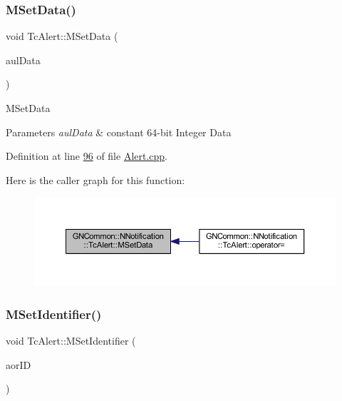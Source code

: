 \subsubsection{\texorpdfstring{M\+Set\+Data()}{MSetData()}}
{\footnotesize\ttfamily void Tc\+Alert\+::\+M\+Set\+Data (\begin{DoxyParamCaption}\item[{const \mbox{\hyperlink{namespace_g_n_common_a9404ee6090c788ae70aebd1436ceb97d}{Tu64}}}]{aul\+Data }\end{DoxyParamCaption})}

M\+Set\+Data 
\begin{DoxyParams}{Parameters}
{\em aul\+Data} & constant 64-\/bit Integer Data \\
\hline
\end{DoxyParams}


Definition at line \mbox{\hyperlink{_alert_8cpp_source_l00096}{96}} of file \mbox{\hyperlink{_alert_8cpp_source}{Alert.\+cpp}}.

Here is the caller graph for this function\+:
\nopagebreak
\begin{figure}[H]
\begin{center}
\leavevmode
\includegraphics[width=350pt]{class_g_n_common_1_1_n_notification_1_1_tc_alert_af4dccb7b428fdd2069a9dd1e6c12410b_icgraph}
\end{center}
\end{figure}
\mbox{\label{class_g_n_common_1_1_n_notification_1_1_tc_alert_a5411a5d9659282e199ceb16a1b88c17d}} 
\subsubsection{\texorpdfstring{M\+Set\+Identifier()}{MSetIdentifier()}}
{\footnotesize\ttfamily void Tc\+Alert\+::\+M\+Set\+Identifier (\begin{DoxyParamCaption}\item[{const \mbox{\hyperlink{class_g_n_common_1_1_n_notification_1_1_tc_identifier}{Tc\+Identifier}} \&}]{aor\+ID }\end{DoxyParamCaption})}

